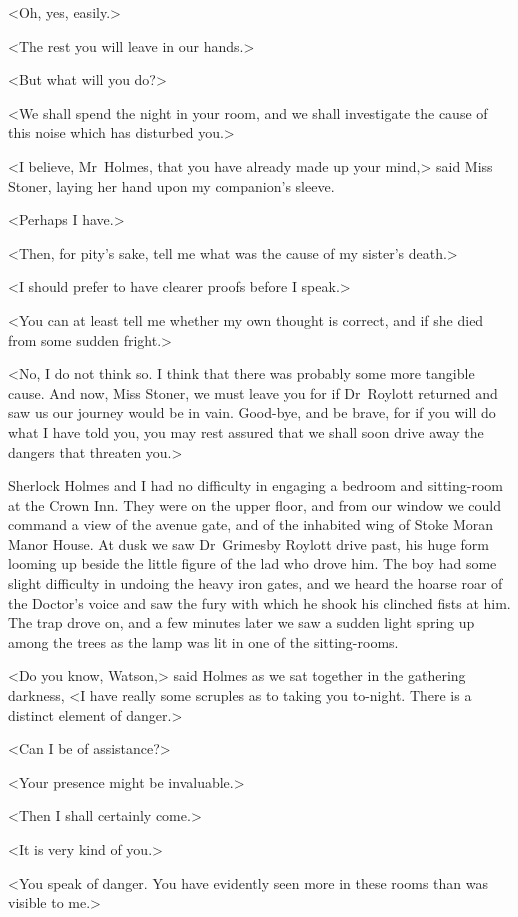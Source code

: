 <Oh, yes, easily.>

<The rest you will leave in our hands.>

<But what will you do?>

<We shall spend the night in your room, and we shall investigate the cause of this noise which has disturbed you.>

<I believe, Mr~Holmes, that you have already made up your mind,> said Miss Stoner, laying her hand upon my companion's sleeve.

<Perhaps I have.>

<Then, for pity's sake, tell me what was the cause of my sister's death.>

<I should prefer to have clearer proofs before I speak.>

<You can at least tell me whether my own thought is correct, and if she died from some sudden fright.>

<No, I do not think so. I think that there was probably some more tangible cause. And now, Miss Stoner, we must leave you for if Dr~Roylott returned and saw us our journey would be in vain. Good-bye, and be brave, for if you will do what I have told you, you may rest assured that we shall soon drive away the dangers that threaten you.>

Sherlock Holmes and I had no difficulty in engaging a bedroom and sitting-room at the Crown Inn. They were on the upper floor, and from our window we could command a view of the avenue gate, and of the inhabited wing of Stoke Moran Manor House. At dusk we saw Dr~Grimesby Roylott drive past, his huge form looming up beside the little figure of the lad who drove him. The boy had some slight difficulty in undoing the heavy iron gates, and we heard the hoarse roar of the Doctor's voice and saw the fury with which he shook his clinched fists at him. The trap drove on, and a few minutes later we saw a sudden light spring up among the trees as the lamp was lit in one of the sitting-rooms.

<Do you know, Watson,> said Holmes as we sat together in the gathering darkness, <I have really some scruples as to taking you to-night. There is a distinct element of danger.>

<Can I be of assistance?>

<Your presence might be invaluable.>

<Then I shall certainly come.>

<It is very kind of you.>

<You speak of danger. You have evidently seen more in these rooms than was visible to me.>

